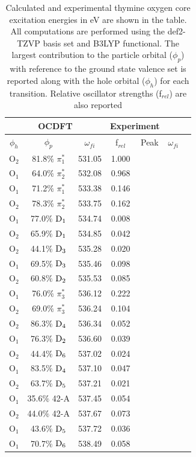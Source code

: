 \documentclass[12pt]{article}
\begin{document}
 \begin{table}
 \centering
     \begin{tabular}{c@{\hskip 0.22in}c@{\hskip 0.22in}c@{\hskip 0.22in}c@{\hskip 0.52in}c@{\hskip 0.22in}c@{\hskip 0.22in}c}
     \hline
     \hline
   \multicolumn{3}{c}{OCDFT} &\multicolumn{2}{c}{Experiment} \\
   \hline
 $\phi_h$ &  $\phi_p$ & $\omega_{fi}$ & f$_{rel}$ & Peak &  $\omega_{fi}$   \\
   \hline
    O$_2$
 &   81.8$\%$ $\pi_1^*$  & 531.05 & 1.000 \\
    O$_1$
 &   64.0$\%$ $\pi_2^*$  & 532.08 & 0.968 \\
    O$_1$
 &   71.2$\%$ $\pi_1^*$  & 533.38 & 0.146 \\
    O$_2$
 &   78.3$\%$ $\pi_2^*$  & 533.75 & 0.162 \\
    O$_1$
 &   77.0$\%$ $\rm D_1$  & 534.74 & 0.008 \\
    O$_2$
 &   65.9$\%$ $\rm D_1$  & 534.85 & 0.042 \\
    O$_2$
 &   44.1$\%$ $\rm D_3$  & 535.28 & 0.020 \\
    O$_1$
 &   69.5$\%$ $\rm D_3$  & 535.46 & 0.098 \\
    O$_2$
 &   60.8$\%$ $\rm D_2$  & 535.53 & 0.085 \\
    O$_1$
 &   76.0$\%$ $\pi_3^*$  & 536.12 & 0.222 \\
    O$_2$
 &   69.0$\%$ $\pi_3^*$  & 536.24 & 0.104 \\
    O$_2$
 &   86.3$\%$ $\rm D_4$  & 536.34 & 0.052 \\
    O$_1$
 &   76.3$\%$ $\rm D_2$  & 536.60 & 0.039 \\
    O$_2$
 &   44.4$\%$ $\rm D_6$  & 537.02 & 0.024 \\
    O$_1$
 &   83.5$\%$ $\rm D_4$  & 537.10 & 0.047 \\
    O$_2$
 &   63.7$\%$ $\rm D_5$  & 537.21 & 0.021 \\
    O$_1$
 &   35.6$\%$ 42-A  & 537.45 & 0.054 \\
    O$_2$
 &   44.0$\%$ 42-A  & 537.67 & 0.073 \\
    O$_1$
 &   43.6$\%$ $\rm D_5$  & 537.72 & 0.036 \\
    O$_1$
 &   70.7$\%$ $\rm D_6$  & 538.49 & 0.058 \\
   \end{tabular}
         \caption{Calculated and experimental thymine oxygen core excitation energies in eV are shown in the table. All computations are performed using the def2-TZVP basis set and B3LYP functional. The largest contribution to the particle orbital ($\phi_p$) with reference to the ground state valence set is reported along with the hole orbital ($\phi_h$) for each transition. Relative oscillator strengths (f$_{rel}$) are also reported}
   \label{table: thymine_k_oxygen}
   \end{table}
\end{document}
